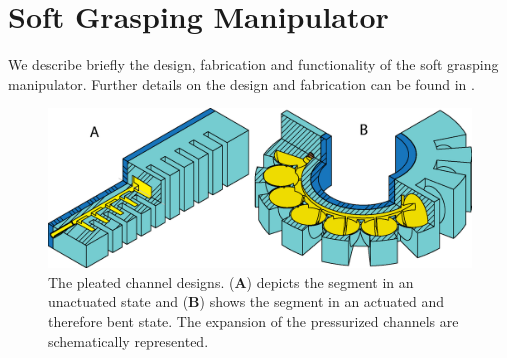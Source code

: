 \section{Soft Grasping Manipulator}
\label{sec:soft_grasping_manipulator}
We describe briefly the design, fabrication and functionality of the soft grasping manipulator. Further details on the design and fabrication can be found in \cite{marchese2015recipe}.


\begin{figure}[thpb]
\centering
   \includegraphics[width=0.90\columnwidth]{figures/robotic_gripper/design_gripper.eps}
   \caption{The pleated channel designs. (\textbf{A}) depicts the segment in an unactuated state and (\textbf{B}) shows the segment in an actuated and therefore bent state. The expansion of the pressurized channels are schematically represented.}
   \label{fig:design}
\end{figure}

